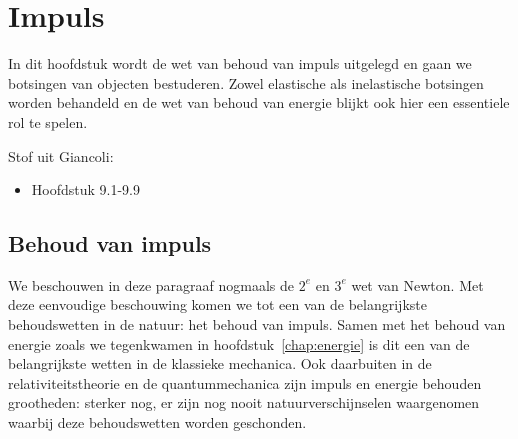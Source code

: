 \chapter{Impuls}

In dit hoofdstuk wordt de wet van behoud van impuls uitgelegd en gaan we botsingen van objecten 
bestuderen. Zowel elastische als inelastische botsingen worden behandeld en de wet van behoud 
van energie blijkt ook hier een essentiele rol te spelen.

Stof uit Giancoli:
\begin{itemize}
\item Hoofdstuk 9.1-9.9
\end{itemize}

\section{Behoud van impuls} \label{sec:impuls}

We beschouwen in deze paragraaf nogmaals de $2^e$ en $3^e$ wet van Newton. Met
deze eenvoudige beschouwing komen we tot een van de belangrijkste behoudswetten 
in de natuur: het behoud van impuls. Samen met het behoud van energie zoals
we tegenkwamen in hoofdstuk~\ref{chap:energie} is dit een van de belangrijkste
wetten in de klassieke mechanica. Ook daarbuiten in de relativiteitstheorie en de 
quantummechanica zijn impuls en energie behouden grootheden: sterker nog, er zijn 
nog nooit natuurverschijnselen waargenomen waarbij deze behoudswetten worden
geschonden.

